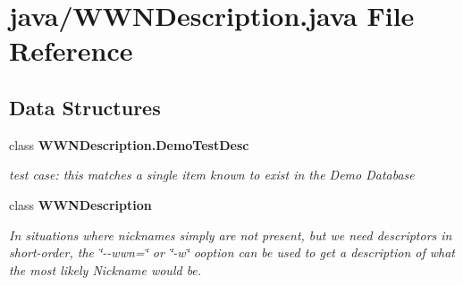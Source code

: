 \section{java/\-W\-W\-N\-Description.java File Reference}
\label{WWNDescription_8java}
\subsection*{Data Structures}
\begin{DoxyCompactItemize}
\item 
class {\bf W\-W\-N\-Description.\-Demo\-Test\-Desc}
\begin{DoxyCompactList}\small\item\em test case\-: this matches a single item known to exist in the Demo Database \end{DoxyCompactList}\item 
class {\bf W\-W\-N\-Description}
\begin{DoxyCompactList}\small\item\em In situations where nicknames simply are not present, but we need descriptors in short-\/order, the \char`\"{}-\/-\/wwn=\char`\"{} or \char`\"{}-\/w\char`\"{} ooption can be used to get a description of what the most likely Nickname would be. \end{DoxyCompactList}\end{DoxyCompactItemize}
